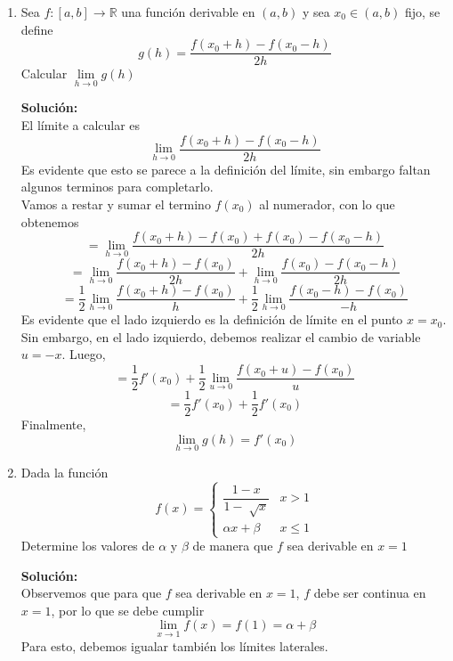 \documentclass[12pt]{article}
\newenvironment{solucion}
{\begin{mdframed}[backgroundcolor=black!10]
		{\bf Solución:}\\
	}
	{
	\end{mdframed}
}
\newenvironment{preguntas}
{\begin{enumerate}\itemsep12pt
	}
	{
	\end{enumerate}
}
\newcommand{\ra}{\rightarrow}
\newcommand{\R}{\mathbb{R}}
\begin{document}
\begin{preguntas}
\begin{solucion}
\begin{enumerate}[a)]
\item $$f'(x) = \lim\limits_{h \ra 0} \dfrac{(x+h+5) - (x+5)}{h} =
 \lim\limits_{h \ra 0} \dfrac{x+h+5 -x-5}{h} =
 \lim\limits_{h \ra 0} \dfrac{h}{h} = 1$$
\item $$f'(x) = \lim\limits_{h \ra 0} \dfrac{(2(x+h)^2-3) - (2x^2-3)}{h} =
\lim\limits_{h \ra 0} \dfrac{2(x^2+2xh+h^2)-3-2x^2+3}{h}$$
$$=
\lim\limits_{h \ra 0} \dfrac{2x^2+4xh+2h^2 - 3 -2x^2+3}{h} =
\lim\limits_{h \ra 0} \dfrac{h(4x+2h)}{h} = 
\lim\limits_{h \ra 0} 4x+2h =
4x$$
\end{enumerate}
\end{solucion}
\item Sea $f:[a,b] \ra \R$ una función derivable en $(a,b)$ y sea $x_0 \in (a,b)$ fijo, se define
$$ g(h) = \dfrac{f(x_0 + h) - f(x_0-h)}{2h}$$
Calcular $\lim\limits_{h \ra 0} g(h)$
\begin{solucion}
El límite a calcular es
$$ \lim\limits_{h \ra 0} \dfrac{f(x_0 + h) - f(x_0-h)}{2h}$$
Es evidente que esto se parece a la definición del límite, sin embargo faltan algunos terminos para completarlo.\\
Vamos a restar y sumar el termino $f(x_0)$ al numerador, con lo que obtenemos
$$= \lim\limits_{h \ra 0} \dfrac{f(x_0 + h) - f(x_0) + f(x_0) - f(x_0-h)}{2h}$$
$$= \lim\limits_{h \ra 0} \dfrac{f(x_0 + h) - f(x_0)}{2h} + \lim\limits_{h \ra 0} \dfrac{f(x_0) - f(x_0-h)}{2h}$$
$$= \dfrac{1}{2}\lim\limits_{h \ra 0} \dfrac{f(x_0 + h) - f(x_0)}{h} + \dfrac{1}{2}\lim\limits_{h \ra 0} \dfrac{f(x_0-h) - f(x_0)}{-h}$$
Es evidente que el lado izquierdo es la definición de límite en el punto $x=x_0$. Sin embargo, en el lado izquierdo, debemos realizar el cambio de variable $u = -x$. Luego,
$$= \dfrac{1}{2}f'(x_0) + \dfrac{1}{2}\lim\limits_{u \ra 0} \dfrac{f(x_0+u) - f(x_0)}{u}$$
$$= \dfrac{1}{2}f'(x_0) + \dfrac{1}{2}f'(x_0)$$
Finalmente,
$$\lim\limits_{h \ra 0} g(h) = f'(x_0)$$
\end{solucion}
\item Dada la función
$$f(x) = \begin{cases}
\dfrac{1-x}{1-\sqrt[]{x}} & x > 1\\
\alpha x + \beta & x \leq 1
\end{cases}$$
Determine los valores de $\alpha$ y $\beta$ de manera que $f$ sea derivable en $x=1$
\begin{solucion}
Observemos que para que $f$ sea derivable en $x=1$, $f$ debe ser continua en $x=1$, por lo que se debe cumplir
$$\lim\limits_{x\ra 1}f(x) = f(1) = \alpha  + \beta$$
Para esto, debemos igualar también los límites laterales.

\end{solucion}
\end{preguntas}
\end{document}
